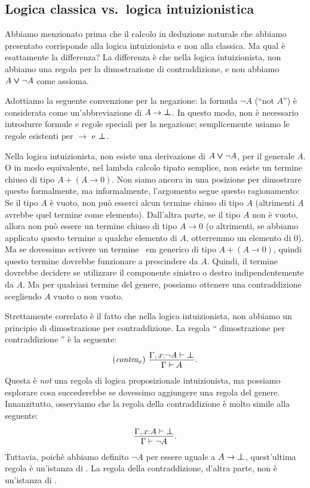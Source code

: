 \documentclass{article}
\begin{document}
\subsection{Logica classica vs.\ logica intuizionistica}

Abbiamo menzionato prima che il calcolo in deduzione naturale che abbiamo
presentato corrisponde alla logica intuizionista e non alla classica. 
Ma qual \`e esattamente la differenza? La differenza \`e
che nella logica intuizionista, non abbiamo una regola per la dimostrazione di
contraddizione, e non abbiamo $A\mathbin{\textrm{\rm\boldmath $\vee$}}\neg A$ come assioma. 

Adottiamo la seguente convenzione per la negazione: la formula $\neg
A$ (``not $A$'') \`e considerata come un'abbreviazione di $A\to\textrm{\rm\boldmath $\bot$}$.
In questo modo, non \`e necessario introdurre formule e regole speciali per la
negazione; semplicemente usiamo le regole esistenti per $\to$ e $\textrm{\rm\boldmath $\bot$}$.

Nella logica intuizionista, non esiste una derivazione di $A\mathbin{\textrm{\rm\boldmath $\vee$}}\neg A$, per il 
generale $A$. O in modo equivalente, nel lambda calcolo tipato semplice, 
non esiste un termine chiuso di tipo $A+(A\to 0)$. Non siamo ancora
 in una posizione per dimostrare questo formalmente, ma informalmente, 
l'argomento segue questo ragionamento: Se il tipo $A$ \`e vuoto, non può esserci
 alcun termine chiuso di tipo $A$ (altrimenti $A$ avrebbe quel termine come 
elemento). Dall'altra parte, se il tipo $A$ non \`e vuoto, allora non può essere 
un termine chiuso di tipo $A\to 0$ (o altrimenti, se abbiamo applicato questo 
termine a qualche elemento di $A$, otterremmo un elemento di $0$). Ma se
 dovessimo scrivere un termine {\ em generico} di tipo $A+(A\to 0)$, quindi 
questo termine dovrebbe funzionare a prescindere da $A$. Quindi, il termine 
dovrebbe decidere se utilizzare il componente sinistro o destro indipendentemente 
da $A$. Ma per qualsiasi termine del genere, possiamo ottenere una contraddizione
 scegliendo $A$ vuoto o non vuoto.

Strettamente correlato \`e il fatto che nella logica intuizionista, non abbiamo
 un principio di dimostrazione per contraddizione. La regola `` dimostrazione per contraddizione '' \`e la seguente:
\[ \trule{contra$_x$}\ \deriv{\Gamma,\typ{x}{\neg A}\tj\cfalse}{\Gamma\tj A}.
\]
Questa \`e {\em not} una regola di logica proposizionale intuizionista, ma possiamo 
esplorare cosa succederebbe se dovessimo aggiungere una regola del genere. Innanzitutto, 
osserviamo che la regola della contraddizione \`e molto simile alla seguente:
\[ \deriv{\Gamma,\typ{x}{A}\tj\cfalse}{\Gamma\tj\neg A}.
\]
Tuttavia, poich\`e abbiamo definito  $\neg A$ per essere uguale a $A\to\textrm{\rm\boldmath $\bot$}$,
quest'ultima regola \`e un'istanza di . La regola della contraddizione, 
d'altra parte, non \`e un'istanza di .
\end{document}

